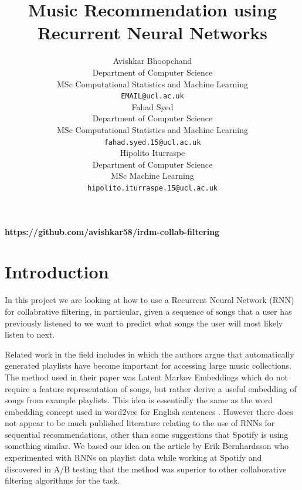 \documentclass{article} %
\title{Music Recommendation using Recurrent Neural Networks}
\author{
Avishkar Bhoopchand\\
Department of Computer Science\\
MSc Computational Statistics and Machine Learning\\
\texttt{EMAIL@ucl.ac.uk} \\
\And
Fahad Syed\\
Department of Computer Science\\
MSc Computational Statistics and Machine Learning\\
\texttt{fahad.syed.15@ucl.ac.uk} \\
\And
Hipolito Iturraspe\\
Department of Computer Science\\
MSc Machine Learning\\
\texttt{hipolito.iturraspe.15@ucl.ac.uk} \\
}
\begin{document}
\maketitle
\begin{center}
\textbf{https://github.com/avishkar58/irdm-collab-filtering}
\end{center}
\clearpage

\section{Introduction}
In this project we are looking at how to use a Recurrent Neural Network (RNN) for collabrative filtering, in particular, given a sequence of songs that a user has previously listened to we want to predict what songs the user will most likely listen to next.


%



Related work in the field includes \cite{playlist-prediction} in which the authors argue that automatically generated playlists have become important for accessing large music collections. The method used in their paper was Latent Markov Embeddings which do not require a feature representation of songs, but rather derive a useful embedding of songs from example playlists. This idea is essentially the same as the word embedding concept used in word2vec for English sentences \cite{word2vec}. However there does not appear to be much published literature relating to the use of RNNs for sequential recommendations, other than some suggestions that Spotify is using something similar. We based our idea on the article by Erik Bernhardsson \cite{erikbern} who experimented with RNNs on playlist data while working at Spotify and discovered in A/B testing that the method was superior to other collaborative filtering algorithms for the task. 
\end{document}
